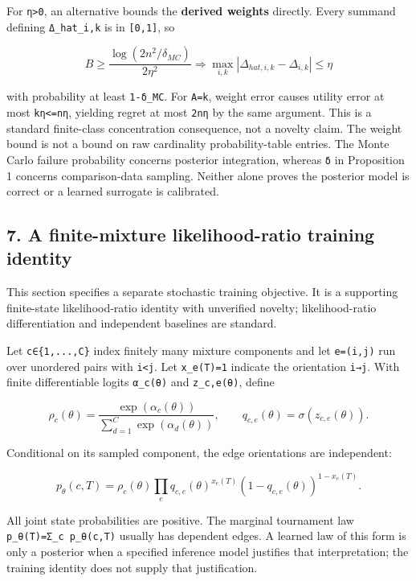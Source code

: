 \documentclass[
  11pt,
]{article}
\begin{document}
For \texttt{η\textgreater{}0}, an alternative bounds the \textbf{derived
weights} directly. Every summand defining \texttt{Δ\_hat\_i,k} is in
\texttt{{[}0,1{]}}, so

\[
B\ge\frac{\log(2n^2/\delta_{MC})}{2\eta^2}
\Longrightarrow\max_{i,k}|\Delta_{hat,i,k}-\Delta_{i,k}|\le\eta
\]

with probability at least \texttt{1-δ\_MC}. For
\texttt{\textbar{}A\textbar{}=k}, weight error causes utility error at
most \texttt{kη\textless{}=nη}, yielding regret at most \texttt{2nη} by
the same argument. This is a standard finite-class concentration
consequence, not a novelty claim. The weight bound is not a bound on raw
cardinality probability-table entries. The Monte Carlo failure
probability concerns posterior integration, whereas \texttt{δ} in
Proposition 1 concerns comparison-data sampling. Neither alone proves
the posterior model is correct or a learned surrogate is calibrated.

\hypertarget{a-finite-mixture-likelihood-ratio-training-identity}{%
\subsection{7. A finite-mixture likelihood-ratio training
identity}\label{a-finite-mixture-likelihood-ratio-training-identity}}

This section specifies a separate stochastic training objective. It is a
supporting finite-state likelihood-ratio identity with unverified
novelty; likelihood-ratio differentiation and independent baselines are
standard.

Let \texttt{c∈\{1,...,C\}} index finitely many mixture components and
let \texttt{e=(i,j)} run over unordered pairs with
\texttt{i\textless{}j}. Let \texttt{x\_e(T)=1} indicate the orientation
\texttt{i→j}. With finite differentiable logits \texttt{α\_c(θ)} and
\texttt{z\_c,e(θ)}, define

\[
\rho_c(\theta)=\frac{\exp(\alpha_c(\theta))}
{\sum_{d=1}^{C}\exp(\alpha_d(\theta))},\qquad
q_{c,e}(\theta)=\sigma(z_{c,e}(\theta)).
\]

Conditional on its sampled component, the edge orientations are
independent:

\[
p_\theta(c,T)=\rho_c(\theta)\prod_e
q_{c,e}(\theta)^{x_e(T)}
(1-q_{c,e}(\theta))^{1-x_e(T)}.
\]

All joint state probabilities are positive. The marginal tournament law
\texttt{p\_θ(T)=Σ\_c\ p\_θ(c,T)} usually has dependent edges. A learned
law of this form is only a posterior when a specified inference model
justifies that interpretation; the training identity does not supply
that justification.
\end{document}
